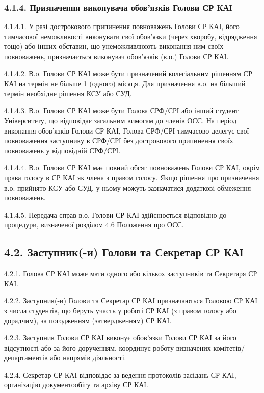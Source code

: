     \subsubsection*{4.1.4. Призначення виконувача обов'язків Голови СР КАІ}
        4.1.4.1. У разі дострокового припинення повноважень Голови СР КАІ, його тимчасової неможливості виконувати свої обов'язки (через хворобу, відрядження тощо) або інших обставин, що унеможливлюють виконання ним своїх повноважень, призначається виконувач обов'язків (в.о.) Голови СР КАІ.
        
        4.1.4.2. В.о. Голови СР КАІ може бути призначений колегіальним рішенням СР КАІ на термін не більше 1 (одного) місяця. Для призначення в.о. на більший термін необхідне рішення КСУ або СУД.
        
        4.1.4.3. В.о. Голови СР КАІ може бути Голова СРФ/СРІ або інший студент Університету, що відповідає загальним вимогам до членів ОСС. На період виконання обов'язків Голови СР КАІ, Голова СРФ/СРІ тимчасово делегує свої повноваження заступнику в СРФ/СРІ без дострокового припинення своїх повноважень у відповідній СРФ/СРІ.
        
        4.1.4.4. В.о. Голови СР КАІ має повний обсяг повноважень Голови СР КАІ, окрім права голосу в СР КАІ як члена з правом голосу. Якщо рішення про призначення в.о. прийнято КСУ або СУД, у ньому можуть зазначатися додаткові обмеження повноважень.
        
        4.1.4.5. Передача справ в.о. Голови СР КАІ здійснюється відповідно до процедури, визначеної розділом 4.6 Положення про ОСС.

\subsection*{4.2. Заступник(-и) Голови та Секретар СР КАІ}
    4.2.1. Голова СР КАІ може мати одного або кількох заступників та Секретаря СР КАІ.

    4.2.2. Заступник(-и) Голови та Секретар СР КАІ призначаються Головою СР КАІ з числа студентів, що беруть участь у роботі СР КАІ (з правом голосу або дорадчим), за погодженням (затвердженням) СР КАІ.

    4.2.3. Заступник Голови СР КАІ виконує обов'язки Голови СР КАІ за його відсутності або за його дорученням, координує роботу визначених комітетів/департаментів або напрямів діяльності.

    4.2.4. Секретар СР КАІ відповідає за ведення протоколів засідань СР КАІ, організацію документообігу та архіву СР КАІ.

